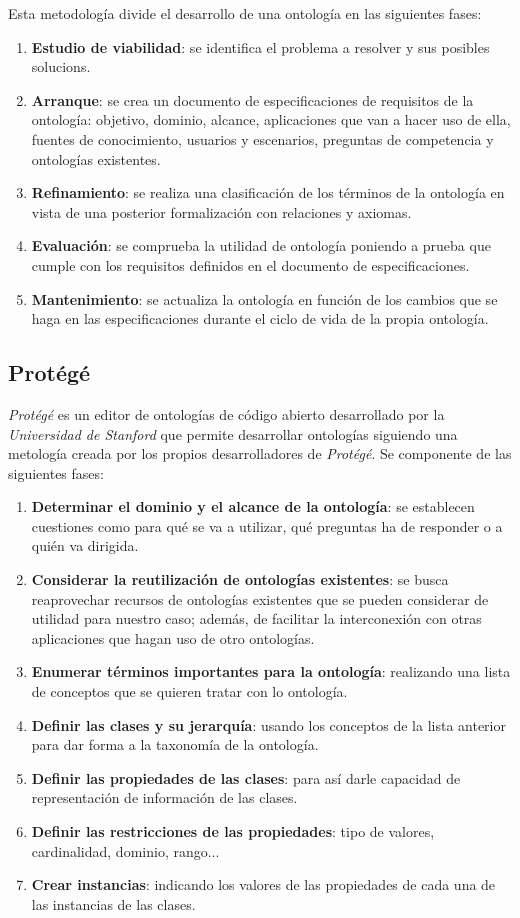 Esta metodología divide el desarrollo de una ontología en las siguientes fases:

\begin{enumerate}
	\item \textbf{Estudio de viabilidad}: se identifica el problema a resolver y sus posibles solucions.
	\item \textbf{Arranque}: se crea un documento de especificaciones de requisitos de la ontología: objetivo, dominio, alcance, aplicaciones que van a hacer uso de ella, fuentes de conocimiento, usuarios y escenarios, preguntas de competencia y ontologías existentes.
	\item \textbf{Refinamiento}: se realiza una clasificación de los términos de la ontología en vista de una posterior formalización con relaciones y axiomas.
	\item \textbf{Evaluación}: se comprueba la utilidad de ontología poniendo a prueba que cumple con los requisitos definidos en el documento de especificaciones.
	\item \textbf{Mantenimiento}: se actualiza la ontología en función de los cambios que se haga en las especificaciones durante el ciclo de vida de la propia ontología.
\end{enumerate}

\subsection{Protégé}

{\it Protégé} es un editor de ontologías de código abierto desarrollado por la {\it Universidad de Stanford} que permite desarrollar ontologías siguiendo una metología creada por los propios desarrolladores de {\it Protégé}. Se componente de las siguientes fases:

\begin{enumerate}
	\item \textbf{Determinar el dominio y el alcance de la ontología}: se establecen cuestiones como para qué se va a utilizar, qué preguntas ha de responder o a quién va dirigida.
	\item \textbf{Considerar la reutilización de ontologías existentes}: se busca reaprovechar recursos de ontologías existentes que se pueden considerar de utilidad para nuestro caso; además, de facilitar la interconexión con otras aplicaciones que hagan uso de otro ontologías.
	\item \textbf{Enumerar términos importantes para la ontología}: realizando una lista de conceptos que se quieren tratar con lo ontología.
	\item \textbf{Definir las clases y su jerarquía}: usando los conceptos de la lista anterior para dar forma a la taxonomía de la ontología.
	\item \textbf{Definir las propiedades de las clases}: para así darle capacidad de representación de información de las clases.
	\item \textbf{Definir las restricciones de las propiedades}: tipo de valores, cardinalidad, dominio, rango...
	\item \textbf{Crear instancias}: indicando los valores de las propiedades de cada una de las instancias de las clases.
\end{enumerate}
	

